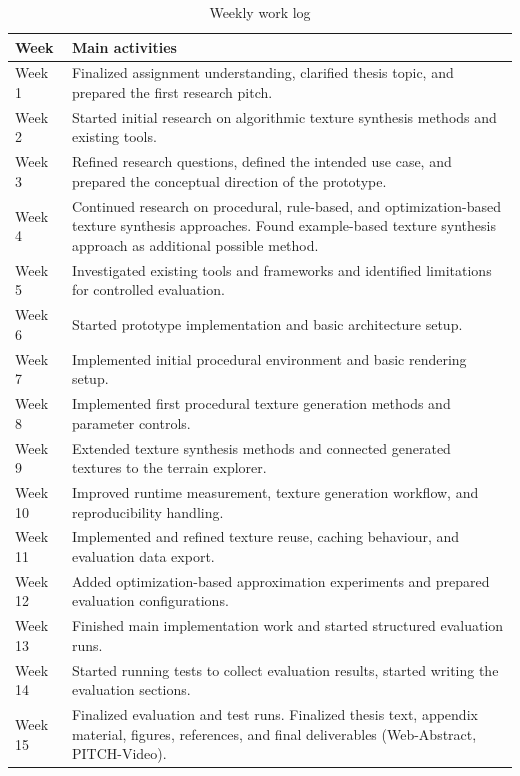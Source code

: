 \begin{table}[H]
\centering
\caption{Weekly work log}
\label{tab:weekly_work_log}
\begin{tabularx}{\textwidth}{|l|X|}
\hline
\textbf{Week} & \textbf{Main activities} \\
\hline
\hline
Week 1 & Finalized assignment understanding, clarified thesis topic, and prepared the first research pitch. \\
\hline
Week 2 & Started initial research on algorithmic texture synthesis methods and existing tools. \\
\hline
Week 3 & Refined research questions, defined the intended use case, and prepared the conceptual direction of the prototype. \\
\hline
Week 4 & Continued research on procedural, rule-based, and optimization-based texture synthesis approaches. Found example-based texture synthesis approach as additional possible method. \\
\hline
Week 5 & Investigated existing tools and frameworks and identified limitations for controlled evaluation. \\
\hline
Week 6 & Started prototype implementation and basic architecture setup. \\
\hline
Week 7 & Implemented initial procedural environment and basic rendering setup. \\
\hline
Week 8 & Implemented first procedural texture generation methods and parameter controls. \\
\hline
Week 9 & Extended texture synthesis methods and connected generated textures to the terrain explorer. \\
\hline
Week 10 & Improved runtime measurement, texture generation workflow, and reproducibility handling. \\
\hline
Week 11 & Implemented and refined texture reuse, caching behaviour, and evaluation data export. \\
\hline
Week 12 & Added optimization-based approximation experiments and prepared evaluation configurations. \\
\hline
Week 13 & Finished main implementation work and started structured evaluation runs. \\
\hline
Week 14 & Started running tests to collect evaluation results, started writing the evaluation sections. \\
\hline
Week 15 & Finalized evaluation and test runs. Finalized thesis text, appendix material, figures, references, and final deliverables (Web-Abstract, PITCH-Video). \\
\hline
\end{tabularx}
\end{table}